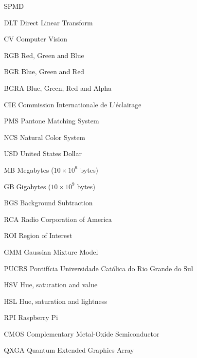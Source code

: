 \documentclass[ecp,tc]{iiufrgs}
\begin{document}
\begin{listofabbrv}{SPMD}
        \item[DLT] Direct Linear Transform
        \item[CV] Computer Vision
        \item[RGB] Red, Green and Blue
        \item[BGR] Blue, Green and Red
        \item[BGRA] Blue, Green, Red and Alpha
        \item[CIE] Commission Internationale de L'éclairage
        \item[PMS] Pantone Matching System
        \item[NCS] Natural Color System
        \item[USD] United States Dollar
        \item[MB] Megabytes ($ 10\times10^6 $ bytes)
        \item[GB] Gigabytes ($ 10\times10^9 $ bytes)
        \item[BGS] Background Subtraction
        \item[RCA] Radio Corporation of America
        \item[ROI] Region of Interest
        \item[GMM] Gaussian Mixture Model
        \item[PUCRS] Pontifícia Universidade Católica do Rio Grande do Sul
        \item[HSV] Hue, saturation and value
        \item[HSL] Hue, saturation and lightness
        \item[RPI] Raspberry Pi
        \item[CMOS] Complementary Metal-Oxide Semiconductor
        \item[QXGA] Quantum Extended Graphics Array
    \end{listofabbrv}


\listoffigures

\listoftables
\end{document}

